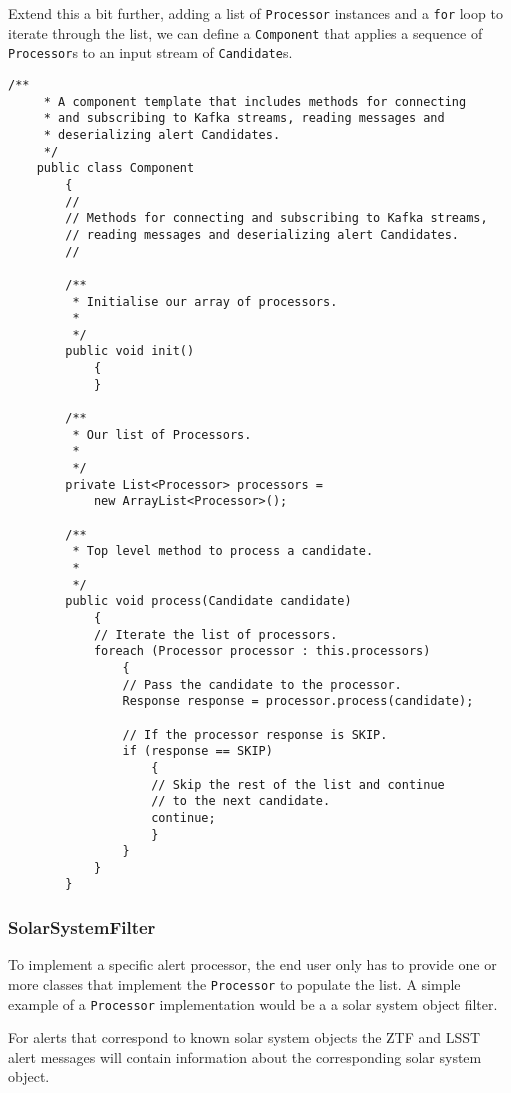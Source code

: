 \documentclass{article}
\newcommand{\ztf} {ZTF\xspace}
\newcommand{\lsst} {LSST\xspace}
\begin{document}
Extend this a bit further, adding a list of \texttt{Processor} instances and a \texttt{for} loop to iterate through the list, we can define a \texttt{Component} that applies a sequence of  \texttt{Processor}s to an input stream of \texttt{Candidate}s.

\begin{lstlisting}[style=Java]
    /**
     * A component template that includes methods for connecting
     * and subscribing to Kafka streams, reading messages and
     * deserializing alert Candidates.
     */
    public class Component
        {
        //
        // Methods for connecting and subscribing to Kafka streams,
        // reading messages and deserializing alert Candidates.
        //

        /**
         * Initialise our array of processors.
         *
         */
        public void init()
            {
            }

        /**
         * Our list of Processors.
         *
         */
        private List<Processor> processors =
            new ArrayList<Processor>();

        /**
         * Top level method to process a candidate.
         *
         */
        public void process(Candidate candidate)
            {
            // Iterate the list of processors.
            foreach (Processor processor : this.processors)
                {
                // Pass the candidate to the processor.
                Response response = processor.process(candidate);

                // If the processor response is SKIP.
                if (response == SKIP)
                    {
                    // Skip the rest of the list and continue
                    // to the next candidate.
                    continue;
                    }
                }
            }
        }
\end{lstlisting}

\subsubsection{SolarSystemFilter}
\label{java-interfaces.SolarSystemFilter}

To implement a specific alert processor, the end user only has to provide one or more classes that implement the \texttt{Processor} to populate the list. A simple example of a \texttt{Processor} implementation would be a a solar system object filter.

For alerts that correspond to known solar system objects the \ztf and \lsst alert messages will contain information about the corresponding solar system object.
\end{document}
